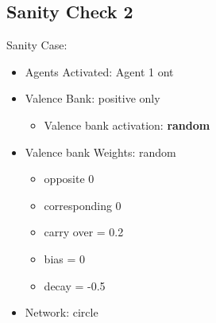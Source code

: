 \documentclass{article}\usepackage[]{graphicx}\usepackage[]{color}
\begin{document}
\subsection{Sanity Check 2}
\label{sec:sanity2}
Sanity Case:
\begin{itemize}
  \item Agents Activated: Agent 1 ont
  \item Valence Bank: positive only
  \begin{itemize}
      \item Valence bank activation: \textbf{random}
  \end{itemize}
  \item Valence bank Weights: random
  \begin{itemize}
      \item opposite 0
      \item corresponding 0
      \item carry over = 0.2
      \item bias = 0
      \item decay = -0.5
  \end{itemize}
  \item Network: circle
\end{itemize}
%
%

\newpage
\end{document}
